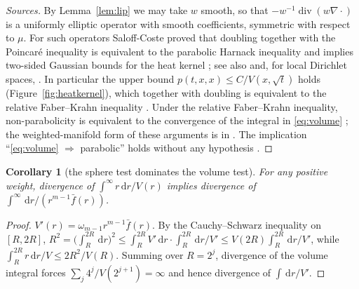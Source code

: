 \documentclass[11pt]{amsart}
\newcommand{\dd}{\,\mathrm{d}}
\newcommand{\fbar}{\bar f}
\DeclareMathOperator{\divg}{div}
\theoremstyle{plain}
\newtheorem{corollary}[theorem]{Corollary}
\theoremstyle{definition}
\theoremstyle{remark}
\begin{document}
\begin{proof}[Sources]
By Lemma~\ref{lem:lip} we may take $w$ smooth, so that $-w^{-1}\divg(w\nabla\cdot)$
is a uniformly elliptic operator with smooth coefficients, symmetric with
respect to $\mu$. For such operators Saloff-Coste proved that doubling together
with the Poincar\'e inequality is equivalent to the parabolic Harnack inequality
\cite[Thm.~3.1]{saloffcoste1992} and implies two-sided Gaussian bounds for the
heat kernel \cite[Thm.~4.2]{saloffcoste1992}; see also \cite{grigoryan1991}
and, for local Dirichlet spaces, \cite{sturm1996}. In particular the upper bound
$p(t,x,x)\le C/V(x,\sqrt t)$ holds (Figure~\ref{fig:heatkernel}), which together with doubling is equivalent to the
relative Faber--Krahn inequality \cite[remark after Thm.~11.1]{grigoryan1999}.
Under the relative Faber--Krahn inequality, non-parabolicity is equivalent to
the convergence of the integral in \eqref{eq:volume}
\cite[Thm.~11.1]{grigoryan1999}; the weighted-manifold form of these arguments is
in \cite{grigoryan2009}. The implication ``\eqref{eq:volume} $\Rightarrow$
parabolic'' holds without any hypothesis \cite[Thm.~7.3]{grigoryan1999}.
\end{proof}

\begin{corollary}[the sphere test dominates the volume test]\label{cor:cs}
For any positive weight, divergence of $\int^\infty r\dd r/V(r)$ implies
divergence of $\int^\infty\dd r/(r^{m-1}\fbar(r))$.
\end{corollary}

\begin{proof}
$V'(r)=\omega_{m-1}r^{m-1}\fbar(r)$. By the Cauchy--Schwarz inequality on
$[R,2R]$, $R^2=\bigl(\int_R^{2R}\dd r\bigr)^2\le\int_R^{2R}V'\dd r\cdot
\int_R^{2R}\dd r/V'\le V(2R)\int_R^{2R}\dd r/V'$, while
$\int_R^{2R}r\dd r/V\le2R^2/V(R)$. Summing over $R=2^j$, divergence of the
volume integral forces $\sum_j4^j/V(2^{j+1})=\infty$ and hence divergence of
$\int\dd r/V'$.
\end{proof}
\end{document}
